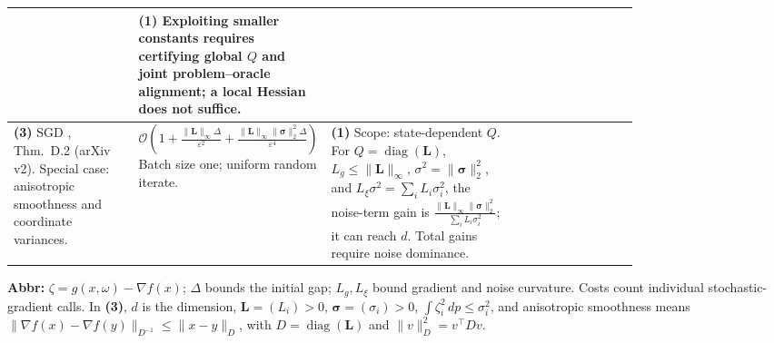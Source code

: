 \begin{table}[tp]
\begin{threeparttable}
\begin{tabularx}{\linewidth}{@{}>{\raggedright\arraybackslash}p{0.20\linewidth}>{\raggedright\arraybackslash}p{0.30\linewidth}>{\raggedright\arraybackslash}p{0.30\linewidth}>{\raggedright\arraybackslash}X@{}}
& \textbf{(1)} Exploiting smaller constants requires certifying global $Q$ and joint problem--oracle alignment; a local Hessian does not suffice. \\
\midrule
\textbf{(3)} SGD \citep{canLiuPanZhang2025}, Thm.~D.2 (arXiv v2).
\newline Special case: anisotropic smoothness and coordinate variances.
& $\mathcal{O}\!\left(1+\frac{\|\mathbf L\|_\infty\Delta}{\varepsilon^2}+\frac{\|\mathbf L\|_\infty\|\boldsymbol\sigma\|_2^2\Delta}{\varepsilon^4}\right)$
\newline Batch size one; uniform random iterate.
& \textbf{(1)} Scope: state-dependent $Q$. For $Q=\operatorname{diag}(\mathbf L)$, $L_g\le\|\mathbf L\|_\infty$, $\sigma^2=\|\boldsymbol\sigma\|_2^2$, and $L_\xi\sigma^2=\sum_iL_i\sigma_i^2$, the noise-term gain is $\frac{\|\mathbf L\|_\infty\|\boldsymbol\sigma\|_2^2}{\sum_iL_i\sigma_i^2}$; it can reach $d$. Total gains require noise dominance. & \\
\bottomrule
\end{tabularx}
\begin{tablenotes}[flushleft]\footnotesize
\item[] \textbf{Abbr:} $\zeta=g(x,\omega)-\nabla f(x)$; $\Delta$ bounds the initial gap; $L_g,L_\xi$ bound gradient and noise curvature. Costs count individual stochastic-gradient calls. In \textbf{(3)}, $d$ is the dimension, $\mathbf L=(L_i)>0$, $\boldsymbol\sigma=(\sigma_i)>0$, $\int\zeta_i^2\,dp\le\sigma_i^2$, and anisotropic smoothness means $\|\nabla f(x)-\nabla f(y)\|_{D^{-1}}\le\|x-y\|_D$, with $D=\operatorname{diag}(\mathbf L)$ and $\|v\|_D^2=v^\top Dv$.
\end{tablenotes}
\end{threeparttable}
\end{table}
\clearpage
